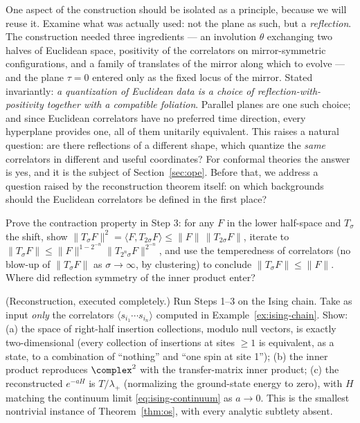 One aspect of the construction should be isolated as a principle, because
we will reuse it. Examine what was actually used: not the plane as
such, but a \emph{reflection}. The construction needed three ingredients ---
an involution $\theta$ exchanging two halves of Euclidean space, positivity
of the correlators on mirror-symmetric configurations, and a family of
translates of the mirror along which to evolve --- and the plane $\tau = 0$
entered only as the fixed locus of the mirror. Stated invariantly: \emph{a
quantization of Euclidean data is a choice of reflection-with-positivity
together with a compatible foliation}. Parallel planes are one such choice;
and since Euclidean correlators have no preferred time direction, every
hyperplane provides one, all of them unitarily equivalent. This raises a
natural question: are there reflections of a different shape,
which quantize the \emph{same} correlators in different and useful
coordinates? For conformal theories the answer is yes, and it is the subject
of Section~\ref{sec:ope}. Before that, we address a question raised by the
reconstruction theorem itself: on which backgrounds should the Euclidean
correlators be defined in the first place?

\begin{exercise}[medium]
\label{exr:contraction}
Prove the contraction property in Step 3: for any $F$ in the lower half-space
and $T_\sigma$ the shift, show $\|T_\sigma F\|^2 = \langle F, T_{2\sigma}
F\rangle \le \|F\| \, \|T_{2\sigma}F\|$, iterate to $\|T_\sigma F\| \le \|F\|^{1 - 2^{-n}}
\|T_{2^n \sigma}F\|^{2^{-n}}$, and use the temperedness of correlators (no
blow-up of $\|T_\sigma F\|$ as $\sigma \to \infty$, by clustering) to conclude
$\|T_\sigma F\| \le \|F\|$. Where did reflection symmetry of the inner product
enter?
\end{exercise}

\begin{exercise}[classic]
\label{exr:os-chain}
(Reconstruction, executed completely.) Run Steps 1--3 on the Ising chain.
Take as input \emph{only} the correlators $\langle s_{i_1}\cdots
s_{i_n}\rangle$ computed in Example~\ref{ex:ising-chain}. Show: (a) the space
of right-half insertion collections, modulo null vectors, is exactly
two-dimensional (every collection of insertions at sites $\ge 1$ is equivalent,
as a state, to a combination of ``nothing'' and ``one spin at site 1''); (b)
the inner product reproduces $\complex^2$ with the transfer-matrix inner
product; (c) the reconstructed $e^{-aH}$ is $T/\lambda_+$ (normalizing the
ground-state energy to zero), with $H$ matching the continuum limit
\eqref{eq:ising-continuum} as $a \to 0$. This is the smallest nontrivial
instance of Theorem~\ref{thm:os}, with every analytic subtlety absent.
\end{exercise}

